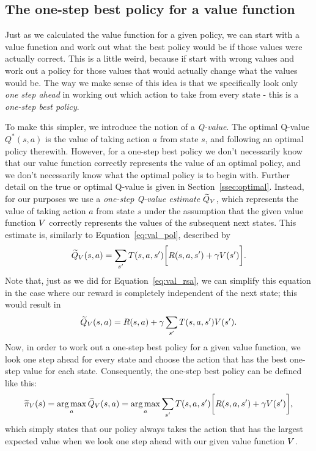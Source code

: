 \documentclass[a4paper]{article}
\begin{document}
\subsection{The one-step best policy for a value function} \label{ssec:one_step}
Just as we calculated the value function for a given policy,
we can start with a value function and work out what the best
policy would be if those values were actually correct.
This is a little weird, because if start with wrong values
and work out a policy for those values that would actually
change what the values would be.
The way we make sense of this idea is that we specifically look
only \emph{one step ahead} in working out which action to take
from every state - this is a \emph{one-step best policy}.

To make this simpler, we introduce the notion of a \emph{Q-value}.
The optimal Q-value $Q^*(s, a)$ is the value of taking action $a$ from
state $s$, and following an optimal policy therewith.
However, for a one-step best policy we don't necessarily know that our value
function correctly represents the value of an optimal policy,
and we don't necessarily know what the optimal policy is to begin with.
Further detail on the true or optimal Q-value is given in
Section~\ref{ssec:optimal}.
Instead, for our purposes we use a \emph{one-step Q-value estimate}
$\widetilde{Q}_V$,
which represents the value of taking action $a$ from state $s$ under the
assumption that the given value function $V$ correctly represents the values
of the subsequent next states.
This estimate is, similarly to Equation~\ref{eq:val_pol}, described by
\begin{equation} \label{eq:q_est}
  \widetilde{Q}_V(s, a) =  \sum_{s'} T(s, a, s') \bigg[ R(s, a, s') + \gamma V(s') \bigg] .
\end{equation}
Note that, just as we did for Equation~\ref{eq:val_rsa}, we can simplify this equation in
the case where our reward is completely independent of the next state;
this would result in
\begin{equation} \label{eq:q_est_rsa}
  \widetilde{Q}_V(s, a) =  R(s, a) + \gamma \sum_{s'} T(s, a, s') V(s') .
\end{equation}
Now, in order to work out a one-step best policy for a given value function,
we look one step ahead for every state and choose the action that has the
best one-step value for each state.
Consequently, the one-step best policy can be defined like this:
\begin{equation} \label{eq:one_step_pol}
  \widetilde{\pi}_V(s) = \operatorname*{arg\,max}_a \widetilde{Q}_V(s, a) = \operatorname*{arg\,max}_a \sum_{s'} T(s, a, s') \bigg[ R(s, a, s') + \gamma V(s') \bigg] ,
\end{equation}
which simply states that our policy always takes the action that has the largest
expected value when we look one step ahead with our given value function $V$.
\end{document}
